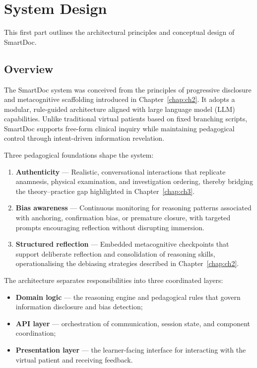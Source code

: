 \section{System Design}
\label{sec:system_design}

This first part outlines the architectural principles and conceptual design of
SmartDoc.

\subsection{Overview}

The SmartDoc system was conceived from the principles of progressive disclosure
and metacognitive scaffolding introduced in Chapter~\ref{chap:ch2}.
It adopts a modular, rule-guided architecture aligned with large language model (LLM)
capabilities.  
Unlike traditional virtual patients based on fixed branching scripts, SmartDoc
supports free-form clinical inquiry while maintaining pedagogical control through
intent-driven information revelation.

Three pedagogical foundations shape the system:

\begin{enumerate}
  \item \textbf{Authenticity} — Realistic, conversational interactions that
  replicate anamnesis, physical examination, and investigation ordering, thereby
  bridging the theory–practice gap highlighted in Chapter~\ref{chap:ch3}.
  \item \textbf{Bias awareness} — Continuous monitoring for reasoning patterns
  associated with anchoring, confirmation bias, or premature closure, with
  targeted prompts encouraging reflection without disrupting immersion.
  \item \textbf{Structured reflection} — Embedded metacognitive checkpoints that
  support deliberate reflection and consolidation of reasoning skills,
  operationalising the debiasing strategies described in Chapter~\ref{chap:ch2}.
\end{enumerate}

The architecture separates responsibilities into three coordinated layers:

\begin{itemize}
  \item \textbf{Domain logic} — the reasoning engine and pedagogical rules that
  govern information disclosure and bias detection;
  \item \textbf{API layer} — orchestration of communication, session state, and
  component coordination;
  \item \textbf{Presentation layer} — the learner-facing interface for
  interacting with the virtual patient and receiving feedback.
\end{itemize}

